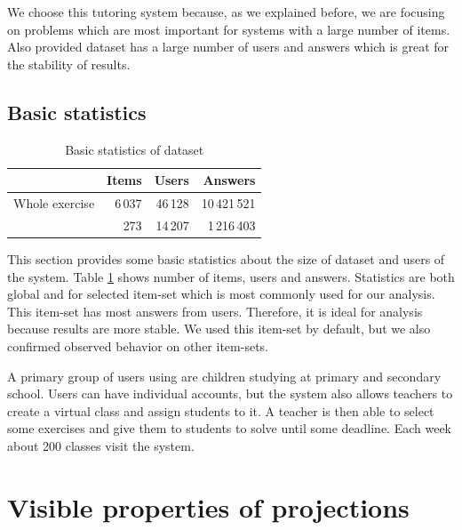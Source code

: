 \documentclass[
  digital, %
  table,   %
  nolof,     %
  nolot,     %
  nocover,
  color,
  final, %
]{fithesis3}
\begin{document}

We choose this tutoring system because, as we explained before, we are focusing on problems which are most important for systems with a large number of items. Also provided dataset has a large number of users and answers which is great for the stability of results.


\subsection{Basic statistics}\label{basic-statistics}

\begin{table}
  \begin{tabular}{|l|r r r|}
    \hline
     & Items & Users & Answers \\
    \hline
    Whole exercise & 6\,037 & 46\,128 & 10\,421\,521 \\
    \cviceniB{} & 273 & 14\,207 & 1\,216\,403 \\
    \hline
  \end{tabular}
  \caption{Basic statistics of dataset}
  \label{tab:basic-statistics}
\end{table}

This section provides some basic statistics about the size of dataset and users of the system. Table \ref{tab:basic-statistics} shows number of items, users and answers. Statistics are both global and for selected item-set \cviceniB{} which is most commonly used for our analysis. This item-set has most answers from users. Therefore, it is ideal for analysis because results are more stable. We used this item-set by default, but we also confirmed observed behavior on other item-sets.


A primary group of users using \umimeCesky{} are children studying at primary and secondary school. Users can have individual accounts, but the system also allows teachers to create a virtual class and assign students to it. A teacher is then able to select some exercises and give them to students to solve until some deadline. Each week about 200 classes visit the system.


\section{Visible properties of projections}\label{visible-properties-of-projections}
\end{document}
